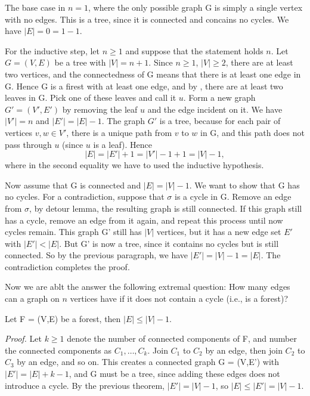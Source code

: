 \documentclass{tufte-handout}
\begin{document}
The base case in \( n=1 \), where the only possible graph G is simply a single vertex with no edges.
This is a tree, since it is connected and concains no cycles. We have \(\left|E\right| = 0 = 1-1\).

For the inductive step, let \( n \geq 1 \) and suppose that the statement holds \( n \). Let
\( G = (V,E) \) be a tree with \(\left|V\right| = n+1\). Since \( n\geq 1  \), \( \left|V\right| \geq 2 \),
there are at least two vertices, and the connectedness of G means that there is at least one edge in G.
Hence G is a firest with at least one edge, and by , there are at least two
leaves in G. Pick one of these leaves and call it \( u \). Form a new graph \( G' = (V',E') \) by removing
the leaf \( u \) and the edge incident on it. We have \(\left|V'\right| = n\) and \(\left|E'\right| = \left|E\right|-1\).
The graph \( G' \) is a tree, because for each pair of vertices \( v,w \in V' \), there is a unique path from \( v \) to \( w \)
in G, and this path does not pass through \( u \) (since \( u \) is a leaf). Hence
\[ \left|E\right| = \left|E'\right| + 1 = \left|V'\right| - 1 + 1 = \left|V\right| - 1, \]
where in the second equality we have to used the inductive hypothesis. 

Now assume that G is connected and \(\left|E\right| = \left|V\right| - 1\). We want to show
that G has no cycles. For a contradiction, suppose that \(\sigma\) is a cycle in G. 
Remove an edge from \(\sigma\), by detour lemma, the resulting graph is still connected.
If this graph still has a cycle, remove an edge from it again, and repeat this process until now cycles remain.
This graph G' still has \(\left|V\right|\) vertices, but it has a new edge set \( E' \) with \(\left|E'\right| < \left|E\right|\).
But G' is now a tree, since it contains no cycles but is still connected. So by the
previous paragraph, we have \(\left|E'\right| = \left|V\right| - 1 = \left|E\right|\).
The contradiction completes the proof. \qedsymbol

Now we are ablt the answer the following extremal question: How many edges
can a graph on \( n \) vertices have if it does not contain a cycle (i.e., is a forest)?

\begin{Corollary}
    Let F = (V,E) be a forest, then \(\left|E\right| \leq \left|V\right| - 1\).
\end{Corollary}
\textit{Proof.} Let \( k \geq 1\) denote the number of connected components of F, and
number the connected components as \( C_1, \ldots, C_k \). Join \( C_1 \) to \( C_2 \) by an edge,
then join \( C_2 \) to \( C_3 \) by an edge, and so on. This creates a connected graph G = (V,E')
with \( \left|E'\right| = \left|E\right| + k - 1 \), and G must be a tree, since adding
these edges does not introduce a cycle. By the previous theorem, 
\(\left|E'\right| = \left|V\right| - 1\), so \(\left|E\right| \leq \left|E'\right| = \left|V\right| - 1\). \qedsymbol
\end{document}
